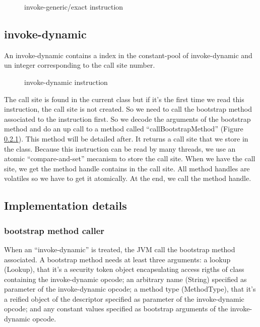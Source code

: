 \documentclass{sig-alternate}
\def \JVM{JVM\xspace}
\begin{document}
    \begin{figure}[!h]
      \centering 
      \caption{invoke-generic/exact instruction}
      \label{INGEins}
    \end{figure}

  \subsection{invoke-dynamic}

    An invoke-dynamic contains a index in the constant-pool of invoke-dynamic and un integer corresponding to the call site number.

    \begin{figure}[!h]
      \centering 
      \caption{invoke-dynamic instruction}
      \label{INDYins}
    \end{figure}

    The call site is found in the current class but if it's the first time we read this instruction, the call site is not created.
    So we need to call the bootstrap method associated to the instruction first.
    So we decode the arguments of the bootstrap method and do an up call to a method called ``callBootstrapMethod'' (Figure \ref{bsm}).
    This method will be detailed after.
    It returns a call site that we store in the class.
    Because this instruction can be read by many threads, we use an atomic ``compare-and-set'' mecanism to store the call site.
    When we have the call site, we get the method handle contains in the call site.
    All method handles are volatiles so we have to get it atomically.
    At the end, we call the method handle.

    \subsection{Implementation details}

      \subsubsection{bootstrap method caller}
        \label{bsm}

        When an ``invoke-dynamic'' is treated, the \JVM call the bootstrap method associated.%
        A bootstrap method needs at least three arguments:
        a lookup (Lookup), that it's a security token object encapsulating access rigths of class containing the invoke-dynamic opcode;
        an arbitrary name (String) specified as parameter of the invoke-dynamic opcode;
        a method type (MethodType), that it's a reified object of the descriptor specified as parameter of the invoke-dynamic opcode;
        and any constant values specified as bootstrap arguments of the invoke-dynamic opcode.
\end{document}
